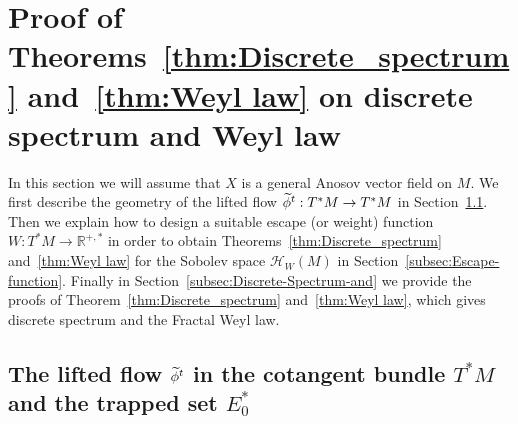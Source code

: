\documentclass[10pt]{amsart}
\theoremstyle{definition}\newtheorem{defi}[theo]{Definition}\newtheorem{rema}[theo]{Remark}\newtheorem{exam}[theo]{Example}\newtheorem{exem}[theo]{Example}\newtheorem{nota}[theo]{Notation}
\newcommand{\clH}{\mathcal{H}}
\newcommand{\bbR}{\mathbb{R}}
\let\oldtilde\tilde
\renewcommand*{\tilde}[1]{\mathchoice{\widetilde{#1}}{\widetilde{#1}}{\oldtilde{#1}}{\oldtilde{#1}}}
\begin{document}
\section{Proof of Theorems~\ref{thm:Discrete_spectrum} and~\ref{thm:Weyl law} on discrete spectrum and Weyl law}\label{sec:Proof-of-Theorem_discrete_spectrum}

In this section we will assume that $X$ is a general Anosov vector field on $M$. We first describe the geometry of the lifted flow $\tilde{\phi}^{t}:T^{*}M\rightarrow T^{*}M$ in Section~\ref{subsec:Dynamics-lifted-in}. Then we explain how to design a suitable escape (or weight) function $W:T^{*}M\rightarrow\bbR^{+,*}$ in order to obtain Theorems~\ref{thm:Discrete_spectrum} and~\ref{thm:Weyl law} for the Sobolev space $\clH _{W}(M)$ in Section~\ref{subsec:Escape-function}. Finally in Section~\ref{subsec:Discrete-Spectrum-and} we provide the proofs of Theorem~\ref{thm:Discrete_spectrum} and~\ref{thm:Weyl law}, which gives discrete spectrum and the Fractal Weyl law.

\subsection{The lifted flow \texorpdfstring{$\tilde{\phi}^{t}$}{phit} in the cotangent bundle \texorpdfstring{$T^{*}M$}{T*M} and the trapped set \texorpdfstring{$E_{0}^{*}$}{E0*}}\label{subsec:Dynamics-lifted-in}
\end{document}
